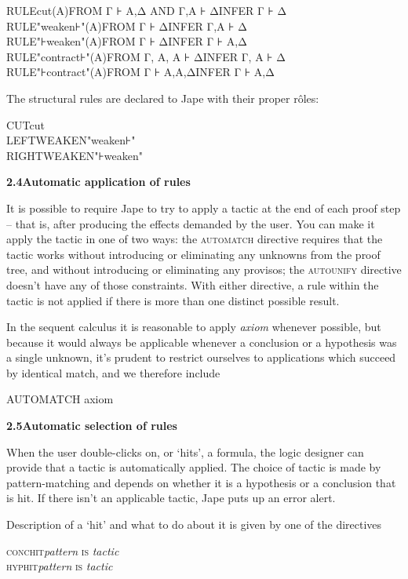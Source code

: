 \documentclass[11pt]{book}
\newcommand{\tab}{\hspace{5mm}}
\begin{document}
RULE\tab cut(A)\tab FROM Γ ⊦ A,Δ AND Γ,A ⊦ Δ\tab INFER Γ ⊦ Δ\\
RULE\tab "weaken⊦"(A)\tab FROM Γ ⊦ Δ\tab INFER Γ,A ⊦ Δ\\
RULE\tab "⊦weaken"(A)\tab FROM Γ ⊦ Δ\tab INFER Γ ⊦ A,Δ\\
RULE\tab "contract⊦"(A)\tab FROM Γ, A, A ⊦ Δ\tab INFER Γ, A ⊦ Δ\\
RULE\tab "⊦contract"(A)\tab FROM Γ ⊦ A,A,Δ\tab INFER Γ ⊦ A,Δ


The structural rules are declared to Jape with their proper r\^{o}les:

CUT\tab cut\\
LEFTWEAKEN\tab "weaken⊦"\\
RIGHTWEAKEN\tab "⊦weaken"


\textbf{{\large 2.4\tab Automatic application of rules}}


It is possible to require Jape to try to apply a tactic at the end of each proof step -- that is, after producing the effects demanded by the user. You can make it apply the tactic in one of two ways: the \textsc{automatch} directive requires that the tactic works without introducing or eliminating any unknowns from the proof tree, and without introducing or eliminating any provisos; the \textsc{autounify} directive doesn't have any of those constraints. With either directive, a rule within the tactic is not applied if there is more than one distinct possible result.


In the sequent calculus it is reasonable to apply \textit{axiom} whenever possible, but because it would always be applicable whenever a conclusion or a hypothesis was a single unknown, it's prudent to restrict ourselves to applications which succeed by identical match, and we therefore include

AUTOMATCH axiom


\textbf{{\large 2.5\tab Automatic selection of rules}}


When the user double-clicks on, or `hits', a formula, the logic designer can provide that a tactic is automatically applied. The choice of tactic is made by pattern-matching and depends on whether it is a hypothesis or a conclusion that is hit. If there isn't an applicable tactic, Jape puts up an error alert.


Description of a `hit' and what to do about it is given by one of the directives

\textsc{conchit\tab }\textit{pattern} \textsc{is} \textit{tactic}\\
\textsc{hyphit\tab }\textit{pattern} \textsc{is} \textit{tactic}
\end{document}
